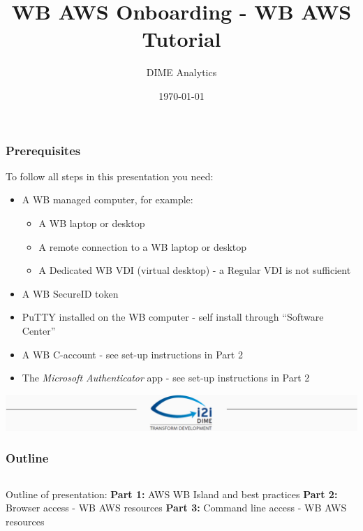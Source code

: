 \documentclass[aspectratio=169]{beamer} %
\title{WB AWS Onboarding - WB AWS Tutorial}
\author{DIME Analytics}
\institute{DIME - The World Bank - \trainingURL{https://www.worldbank.org/en/research/dime}}
\date{\today}
\begin{document}
\begin{frame}
	\frametitle{Prerequisites}

		To follow all steps in this presentation you need:

		\begin{itemize}
			\setlength\itemsep{.8em}
			\item A WB managed computer, for example:
			\begin{itemize}
				\item A WB laptop or desktop
				\item A remote connection to a WB laptop or desktop
				\item A Dedicated WB VDI (virtual desktop) - a Regular VDI is not sufficient
			\end{itemize}
			\item A WB SecureID token
			\item PuTTY installed on the WB computer - self install through ``Software Center''
			\item A WB C-account - see set-up instructions in Part 2
			\item The \textit{Microsoft Authenticator} app - see set-up instructions in Part 2
		\end{itemize}
\end{frame}

\begin{frame}
	\includegraphics[width=\textwidth]{img/Header.png}
	\vspace{-0.2cm}
	\titlepage 	 %
\end{frame}

\begin{frame}
	\frametitle{Outline}

	\begin{columns}[c]
		\Huge Outline of presentation:
		\vspace{.7cm}\newline
		\large \textbf{Part 1:} AWS WB Island and best practices
		\vspace{.7cm}\newline
		\large \textbf{Part 2:} Browser access - WB AWS resources
		\vspace{.7cm}\newline
		\large \textbf{Part 3:} Command line access - WB AWS resources

	\end{columns}
\end{frame}
\end{document}
